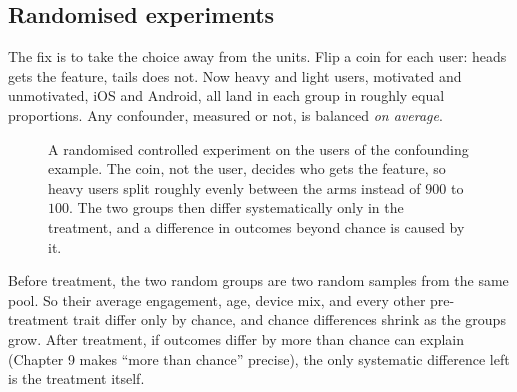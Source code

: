 \subsection{Randomised experiments}

The fix is to take the choice away from the units. Flip a coin for each user: heads gets
the feature, tails does not. Now heavy and light users, motivated and unmotivated, iOS
and Android, all land in each group in roughly equal proportions. Any confounder, measured
or not, is balanced \emph{on average}.

\begin{figure}[H]
\centering
{}
\caption{A randomised controlled experiment on the users of the confounding example.
The coin, not the user, decides who gets the feature, so heavy users split roughly
evenly between the arms instead of $900$ to $100$. The two groups then differ
systematically only in the treatment, and a difference in outcomes beyond chance is
caused by it.}
\label{fig:sampling-randomise}
\end{figure}

\begin{whybox}
Before treatment, the two random groups are two random samples from the same pool. So
their average engagement, age, device mix, and every other pre-treatment trait differ
only by chance, and chance differences shrink as the groups grow. After treatment, if
outcomes differ by more than chance can explain (Chapter 9 makes ``more than chance''
precise), the only systematic difference left is the treatment itself.
\end{whybox}

